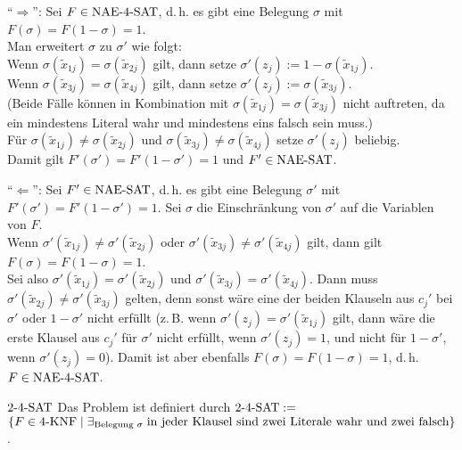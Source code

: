 \begin{Beweis}
    "`$\Rightarrow$"':
    Sei $F \in \text{NAE-}4\text{-SAT}$,
    d.\,h. es gibt eine Belegung $\sigma$ mit $F(\sigma) = F(1 - \sigma) = 1$.\\
    Man erweitert $\sigma$ zu $\sigma'$ wie folgt:\\
    Wenn $\sigma(\widetilde{x}_{1j}) = \sigma(\widetilde{x}_{2j})$ gilt, dann setze
    $\sigma'(z_j) := 1 - \sigma(\widetilde{x}_{1j})$.\\
    Wenn $\sigma(\widetilde{x}_{3j}) = \sigma(\widetilde{x}_{4j})$ gilt, dann setze
    $\sigma'(z_j) := \sigma(\widetilde{x}_{3j})$.\\
    (Beide Fälle können in Kombination mit
    $\sigma(\widetilde{x}_{1j}) = \sigma(\widetilde{x}_{3j})$
    nicht auftreten, da ein mindestens Literal wahr und mindestens eins falsch sein muss.)\\
    Für $\sigma(\widetilde{x}_{1j}) \not= \sigma(\widetilde{x}_{2j})$ und
    $\sigma(\widetilde{x}_{3j}) \not= \sigma(\widetilde{x}_{4j})$ setze
    $\sigma'(z_j)$ beliebig.\\
    Damit gilt $F'(\sigma') = F'(1 - \sigma') = 1$ und $F' \in \text{NAE-SAT}$.
    
    "`$\Leftarrow$"':
    Sei $F' \in \text{NAE-SAT}$,
    d.\,h. es gibt eine Belegung $\sigma'$ mit $F'(\sigma') = F'(1 - \sigma') = 1$.
    Sei $\sigma$ die Einschränkung von $\sigma'$ auf die Variablen von $F$.\\
    Wenn $\sigma'(\widetilde{x}_{1j}) \not= \sigma'(\widetilde{x}_{2j})$ oder
    $\sigma'(\widetilde{x}_{3j}) \not= \sigma'(\widetilde{x}_{4j})$ gilt,
    dann gilt $F(\sigma) = F(1 - \sigma) = 1$.\\
    Sei also $\sigma'(\widetilde{x}_{1j}) = \sigma'(\widetilde{x}_{2j})$ und
    $\sigma'(\widetilde{x}_{3j}) = \sigma'(\widetilde{x}_{4j})$.
    Dann muss $\sigma'(\widetilde{x}_{2j}) \not= \sigma'(\widetilde{x}_{3j})$ gelten,
    denn sonst wäre eine der beiden Klauseln aus $c_j'$ bei $\sigma'$ oder $1 - \sigma'$
    nicht erfüllt
    (z.\,B. wenn $\sigma'(z_j) = \sigma'(\widetilde{x}_{1j})$ gilt,
    dann wäre die erste Klausel aus $c_j'$ für $\sigma'$ nicht erfüllt, wenn
    $\sigma'(z_j) = 1$, und nicht für $1 - \sigma'$, wenn $\sigma'(z_j) = 0$).
    Damit ist aber ebenfalls $F(\sigma) = F(1 - \sigma) = 1$, d.\,h. $F \in \text{NAE-}4\text{-SAT}$.
\end{Beweis}

\linie

\begin{Def}{$2\text{-}4\text{-SAT}$}
    Das Problem  ist definiert durch $2\text{-}4\text{-SAT} :=$\\
    $\{F \in 4\text{-KNF} \;|\; \exists_{\text{Belegung } \sigma}\;
    \text{in jeder Klausel sind zwei Literale wahr und zwei falsch}\}$.
\end{Def}

